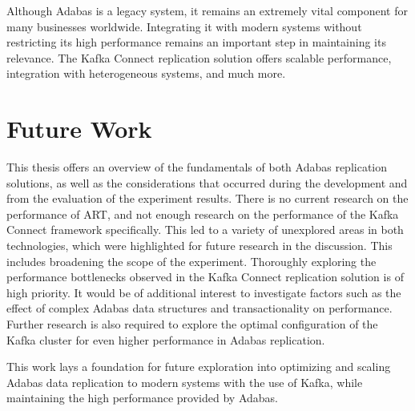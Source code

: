 Although Adabas is a legacy system, it remains an extremely vital component for many businesses worldwide. Integrating it with modern systems without restricting its high performance remains an important step in maintaining its relevance. The Kafka Connect replication solution offers scalable performance, integration with heterogeneous systems, and much more.

\section{Future Work}
This thesis offers an overview of the fundamentals of both Adabas replication solutions, as well as the considerations that occurred during the development and from the evaluation of the experiment results. There is no current research on the performance of \ac{ART}, and not enough research on the performance of the Kafka Connect framework specifically. This led to a variety of unexplored areas in both technologies, which were highlighted for future research in the discussion. This includes broadening the scope of the experiment. Thoroughly exploring the performance bottlenecks observed in the Kafka Connect replication solution is of high priority. It would be of additional interest to investigate factors such as the effect of complex Adabas data structures and transactionality on performance. Further research is also required to explore the optimal configuration of the Kafka cluster for even higher performance in Adabas replication.

This work lays a foundation for future exploration into optimizing and scaling Adabas data replication to modern systems with the use of Kafka, while maintaining the high performance provided by Adabas.